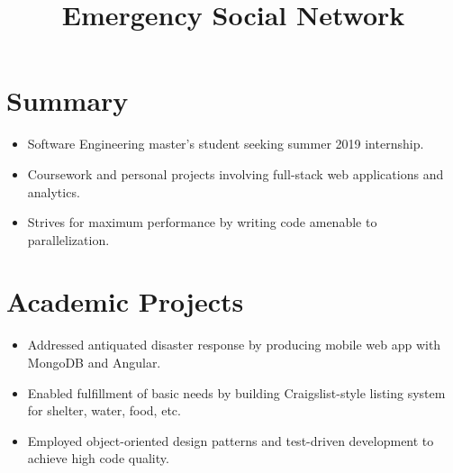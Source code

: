 \documentclass[12pt]{res} %
\begin{document}
    \begin{resume}
 
      \section{Summary}
      \begin{itemize}[leftmargin=-0.4cm, rightmargin=0.8cm]
        \itemsep0em
        \item Software Engineering master's student seeking summer 2019 internship.
        \item Coursework and personal projects involving full-stack web applications and analytics.
        \item Strives for maximum performance by writing code amenable to parallelization.
        \end{itemize}
        \vspace{-10pt}
      
        \section{Academic Projects}
          \vspace{2pt}

          \title{\textbf{Emergency Social Network}}
          \begin{position}
            \vspace{-14pt}
            \begin{itemize}[leftmargin=-0.4cm, rightmargin=0.8cm]
            \itemsep0em
            \item Addressed antiquated disaster response by producing mobile web app with MongoDB and Angular.
            \item Enabled fulfillment of basic needs by building Craigslist-style listing system for shelter, water, food, etc.
            \item Employed object-oriented design patterns and test-driven development to achieve high code quality.
            \end{itemize}
          \end{position}
          \vspace{-10pt}


\end{resume}
\end{document}
